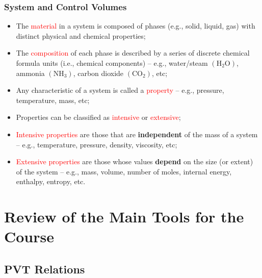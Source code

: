 \documentclass[10pt,compress]{beamer}
\begin{document}
\begin{frame}
 \frametitle{System and Control Volumes}
 \begin{itemize}
  \item <2-> The \textcolor{red}{material} in a system is composed of phases (e.g., solid, liquid, gas) with distinct physical and chemical properties;
  \item <3-> The \textcolor{red}{composition} of each phase is described by a series of discrete chemical formula units (i.e., chemical components) -- e.g., water/steam $\left(\right.$H$_{2}$O$\left.\right)$, ammonia $\left(\right.$NH$_{3}\left.\right)$, carbon dioxide $\left(\right.$CO$_{2}\left.\right)$, etc;
  \item <4-> Any characteristic of a system is called a \textcolor{red}{property} -- e.g., pressure, temperature, mass, etc;
  \item <5-> Properties can be classified as \textcolor{red}{intensive} or \textcolor{red}{extensive};
  \item <6-> \textcolor{red}{Intensive properties} are those that are {\bf independent} of the mass of a system -- e.g., temperature, pressure, density, viscosity, etc;
  \item <7-> \textcolor{red}{Extensive properties} are those whose values {\bf depend} on the size (or extent) of the system -- e.g., mass, volume, number of moles, internal energy, enthalpy, entropy, etc.  
 \end{itemize}
\end{frame}




\section{Review of the Main Tools for the Course}


\subsection{PVT Relations}
\end{document}
